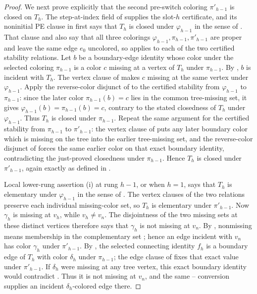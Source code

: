 \begin{proof}
We next prove explicitly that the second pre-switch coloring
\(\pi'_{h-1}\) is closed on \(T_h\).  The step-at-index field of
 supplies the slot-\(h\) certificate, and its
noninitial PE clause in  first says that
\(T_h\) is closed under
\(\varphi_{h-1}\) in the sense of .
That clause and  also say that all three
colorings \(\varphi_{h-1},\pi_{h-1},\pi'_{h-1}\) are proper and leave the
same edge \(e_0\) uncolored, so  applies to each of the two
certified stability relations.  Let
\(b\) be a boundary-edge identity whose color under the selected coloring
\(\pi_{h-1}\) is a color \(c\) missing at a vertex of \(T_h\) under
\(\pi_{h-1}\).  By , \(b\) is incident with
\(T_h\).  The vertex clause of  makes \(c\)
missing at the same vertex under \(\varphi_{h-1}\).  Apply the reverse-color
disjunct of  to the certified stability from
\(\varphi_{h-1}\) to \(\pi_{h-1}\): since the later color
\(\pi_{h-1}(b)=c\) lies in the common tree-missing set, it gives
\(\varphi_{h-1}(b)=\pi_{h-1}(b)=c\), contrary to the stated closedness of
\(T_h\) under \(\varphi_{h-1}\).  Thus \(T_h\) is closed under
\(\pi_{h-1}\).  Repeat the same argument for the certified stability from
\(\pi_{h-1}\) to \(\pi'_{h-1}\): the vertex clause of
 puts any later boundary color which is missing on
the tree into the earlier tree-missing set, and the reverse-color disjunct
of  forces the same earlier color on that exact boundary
identity, contradicting the just-proved closedness under \(\pi_{h-1}\).
Hence \(T_h\) is closed under \(\pi'_{h-1}\), again exactly as defined in
.

Local lower-rung assertion (i) at rung \(h-1\), or
 when \(h=1\), says that \(T_h\) is
elementary under \(\varphi_{h-1}\) in the sense of
.  The vertex clauses of the two
 relations preserve each individual missing-color
set, so \(T_h\) is elementary under \(\pi'_{h-1}\).  Now \(\gamma_h\) is
missing at \(v_h\), while \(v_h\ne v_n\).  The disjointness of the two
missing sets at these distinct vertices therefore says that \(\gamma_h\)
is not missing at \(v_n\).  By , nonmissing means
membership in the complementary set ; hence an
edge incident with \(v_n\) has color \(\gamma_h\) under
\(\pi'_{h-1}\).  By , the selected
connecting identity \(f_h\) is a boundary edge of \(T_h\) with color
\(\delta_h\) under \(\pi_{h-1}\); the edge clause of
 fixes that exact value under \(\pi'_{h-1}\).
If \(\delta_h\) were missing at any tree vertex, this exact
boundary identity would contradict .
Thus it is not missing at \(v_n\), and the same
-- conversion supplies an
incident \(\delta_h\)-colored edge there.


\end{proof}
